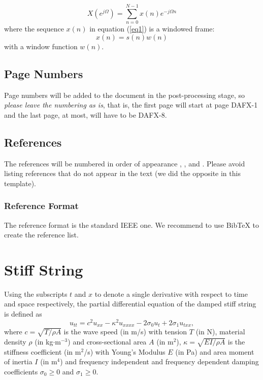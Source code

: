 \documentclass[twoside,a4paper]{article}
\begin{document}
\begin{equation}
	X(e^{j\Omega})=\sum_{n=0}^{N-1}x(n)e^{-j\Omega n}
	\label{eq1}
	\end{equation}
	where the sequence $x(n)$ in equation (\ref{eq1}) is a windowed frame:
	\begin{equation}
	x(n)=s(n) w(n)
	\label{eq2}
\end{equation}
%
with a window function $w(n)$.


\subsection{Page Numbers}
Page numbers will be added to the document in the post-processing stage, so {\em please leave the numbering as is},
that is, the first page will start at page DAFX-1 and the last page, at most, will have to be DAFX-8.


\subsection{References}
The references will be numbered in order of appearance \cite{Mitra:Kaiser:1993:DSP:handbook}, \cite{Haykin:1991:adaptive:filter}, \cite{Moorer:2000:AES:audio:millenium} and \cite{Nackaerts:2001:ICMC}. Please avoid listing references that do not appear in the text (we did the opposite in this template).


\subsubsection{Reference Format}
The reference format is the standard IEEE one. We recommend to use BibTeX to create the reference list.

\section{Stiff String}
Using the subscripts $t$ and $x$ to denote a single derivative with respect to time and space respectively, the partial differential equation of the damped stiff string is defined as
\begin{equation}\label{eq:PDE}
    u_{tt} = c^2u_{xx}-\kappa^2u_{xxxx}-2\sigma_0u_t+2\sigma_1u_{txx},
\end{equation}
where $c = \sqrt{T/\rho A}$ is the wave speed (in m/s) with tension $T$ (in N), material density $\rho$ (in kg$\cdot$m$^{-3}$) and cross-sectional area $A$ (in m$^2$), $\kappa = \sqrt{EI/\rho A}$ is the stiffness coefficient (in m$^2$/s) with Young's Modulus $E$ (in Pa) and area moment of inertia $I$ (in m$^4$) and frequency independent and frequency dependent damping coefficients $\sigma_0 \geq 0$ and $\sigma_1 \geq 0$.
\end{document}
